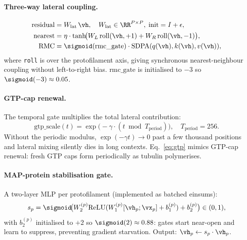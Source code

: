 \paragraph{Three-way lateral coupling.}
\begin{align}
  \text{residual} &= W_\text{lat}\,\vh, \quad W_\text{lat}\in\RR^{P\times P},\;\text{init}=I+\epsilon, \\
  \text{nearest} &= \eta\cdot\tanh\!\bigl(W_L\,\mathrm{roll}(\vh,+1)+W_R\,\mathrm{roll}(\vh,-1)\bigr), \label{eq:roll}\\
  \text{RMC} &= \sigmoid(\text{rmc\_gate})\cdot\mathrm{SDPA}(q(\vh),k(\vh),v(\vh)),
\end{align}
where \texttt{roll} is over the protofilament axis, giving synchronous nearest-neighbour coupling without left-to-right bias. $\text{rmc\_gate}$ is initialised to $-3$ so $\sigmoid(-3)\approx 0.05$.

\paragraph{GTP-cap renewal.}
The temporal gate multiplies the total lateral contribution:
\begin{equation}
  \text{gtp\_scale}(t) = \exp\!\bigl(-\gamma\cdot(t\bmod T_\text{period})\bigr), \quad T_\text{period}=256.
  \label{eq:gtp}
\end{equation}
Without the periodic modulus, $\exp(-\gamma t)\to 0$ past a few thousand positions and lateral mixing silently dies in long contexts. Eq.~\eqref{eq:gtp} mimics GTP-cap renewal: fresh GTP caps form periodically as tubulin polymerises.

\paragraph{MAP-protein stabilisation gate.}
A two-layer MLP per protofilament (implemented as batched einsums):
\begin{equation}
  s_p = \sigmoid\!\bigl(W_2^{(p)}\mathrm{ReLU}(W_1^{(p)}[\vh_p;\vx_p]+b_1^{(p)})+b_2^{(p)}\bigr)\in(0,1),
\end{equation}
with $b_2^{(p)}$ initialised to $+2$ so $\sigmoid(2)\approx 0.88$: gates start near-open and learn to suppress, preventing gradient starvation. Output: $\vh_p\leftarrow s_p\cdot\vh_p$.

